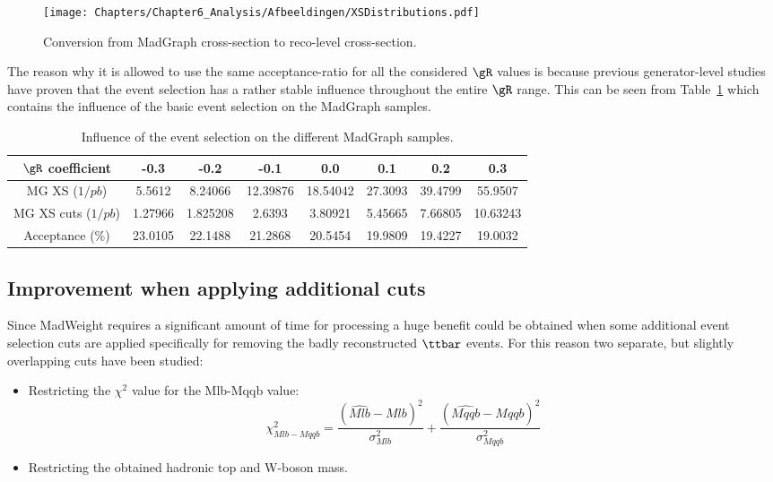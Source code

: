 \begin{figure}[h!t]
  \centering
  \texttt{[image: Chapters/Chapter6\_Analysis/Afbeeldingen/XSDistributions.pdf]}
  \caption{Conversion from MadGraph cross-section to reco-level cross-section.}
  \label{fig::XSRecoFromMG}
\end{figure}

The reason why it is allowed to use the same acceptance-ratio for all the considered $\gR$ values is because previous generator-level studies have proven that the event selection has a rather stable influence throughout the entire $\gR$ range. This can be seen from Table~\ref{table::AccInfl} which contains the influence of the basic event selection on the MadGraph samples.
\begin{table}[h!t]
 \caption{Influence of the event selection on the different MadGraph samples.} \label{table::AccInfl}
 \begin{tabular}{|c||c|c|c|c|c|c|c|}
  \hline
  $\gR$ coefficient 	& -0.3 		& -0.2 		& -0.1 		& 0.0 		& 0.1 		& 0.2 		& 0.3 		\\
  \hline
  MG XS ($1/pb$) 	& 5.5612	& 8.24066	& 12.39876	& 18.54042	& 27.3093	& 39.4799	& 55.9507	\\
  MG XS cuts ($1/pb$) 	& 1.27966	& 1.825208	& 2.6393	& 3.80921	& 5.45665	& 7.66805	& 10.63243 	\\
  \hline
  Acceptance ($\%$) 	& 23.0105	& 22.1488	& 21.2868	& 20.5454	& 19.9809	& 19.4227	& 19.0032	\\
  \hline
 \end{tabular}

\end{table}


\subsection{Improvement when applying additional cuts}
Since MadWeight requires a significant amount of time for processing a huge benefit could be obtained when some additional event selection cuts are applied specifically for removing the badly reconstructed $\ttbar$ events. For this reason two separate, but slightly overlapping cuts have been studied:
\begin{itemize}
 \item Restricting the $\chi^{2}$ value for the Mlb-Mqqb value: 
 \begin{equation}
  \chi^{2}_{Mlb-Mqqb} = \frac{(\hat{Mlb} - Mlb)^{2}}{\sigma_{Mlb}^{2}} + \frac{(\hat{Mqqb} - Mqqb)^{2}}{\sigma_{Mqqb}^{2}}
 \end{equation}
 \item Restricting the obtained hadronic top and W-boson mass.
\end{itemize}

